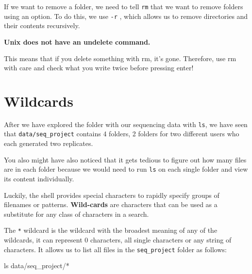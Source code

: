 \documentclass[
  letterpaper,
  DIV=11,
  numbers=noendperiod]{scrreprt}
\newenvironment{Shaded}{}{}
\newcommand{\FunctionTok}[1]{\textcolor[rgb]{0.44,0.26,0.76}{#1}}
\newcommand{\NormalTok}[1]{\textcolor[rgb]{0.14,0.16,0.18}{#1}}
\newcommand{\PreprocessorTok}[1]{\textcolor[rgb]{0.84,0.23,0.29}{#1}}
\begin{document}
If we want to remove a folder, we need to tell \texttt{rm} that we want
to remove folders using an option. To do this, we use \texttt{-r} ,
which allows us to remove directories and their contents recursively.

\begin{tcolorbox}[enhanced jigsaw, rightrule=.15mm, colbacktitle=quarto-callout-important-color!10!white, colframe=quarto-callout-important-color-frame, colback=white, arc=.35mm, opacitybacktitle=0.6, coltitle=black, bottomtitle=1mm, breakable, bottomrule=.15mm, leftrule=.75mm, titlerule=0mm, title=\textcolor{quarto-callout-important-color}{\faExclamation}\hspace{0.5em}{Important}, toprule=.15mm, toptitle=1mm, opacityback=0, left=2mm]

\textbf{Unix does not have an undelete command.}

This means that if you delete something with rm, it's gone. Therefore,
use rm with care and check what you write twice before pressing enter!

\end{tcolorbox}

\section{Wildcards}\label{wildcards}

After we have explored the folder with our sequencing data with
\texttt{ls}, we have seen that \texttt{data/seq\_project} contains 4
folders, 2 folders for two different users who each generated two
replicates.

You also might have also noticed that it gets tedious to figure out how
many files are in each folder because we would need to run \texttt{ls}
on each single folder and view its content individually.

Luckily, the shell provides special characters to rapidly specify groups
of filenames or patterns. \textbf{Wild-cards} are characters that can be
used as a substitute for any class of characters in a search.

The \texttt{*} wildcard is the wildcard with the broadest meaning of any
of the wildcards, it can represent 0 characters, all single characters
or any string of characters. It allows us to list all files in the
\texttt{seq\_project} folder as follows:

\begin{Shaded}
\begin{Highlighting}[]
\FunctionTok{ls}\NormalTok{ data/seq\_project/}\PreprocessorTok{*}
\end{Highlighting}
\end{Shaded}
\end{document}

